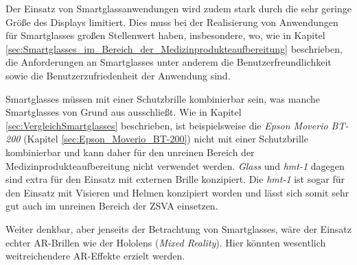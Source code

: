 Der Einsatz von Smartglassanwendungen wird zudem stark durch die sehr geringe Größe des Displays limitiert. Dies muss bei der Realisierung von Anwendungen für Smartglasses großen Stellenwert haben, insbesondere, wo, wie in Kapitel \ref{sec:Smartglasses_im_Bereich_der_Medizinprodukteaufbereitung} beschrieben, die Anforderungen an Smartglasses unter anderem die Benutzerfreundlichkeit sowie die Benutzerzufriedenheit der Anwendung sind.

Smartglasses müssen mit einer Schutzbrille kombinierbar sein, was manche Smartglasses von Grund aus ausschließt. Wie in Kapitel \ref{sec:VergleichSmartglasses} beschrieben, ist beispielsweise die \emph{Epson Moverio BT-200} (Kapitel \ref{sec:Epson_Moverio_BT-200}) nicht mit einer Schutzbrille kombinierbar und kann daher für den unreinen Bereich der Medizinprodukteaufbereitung nicht verwendet werden. \emph{Glass} und \emph{hmt-1} dagegen sind extra für den Einsatz mit externen Brille konzipiert. Die \emph{hmt-1} ist sogar für den Einsatz mit Visieren und Helmen konzipiert worden und lässt sich somit sehr gut auch im unreinen Bereich der ZSVA einsetzen.

Weiter denkbar, aber jenseits der Betrachtung von Smartglasses, wäre der Einsatz echter AR-Brillen wie der Hololens (\emph{Mixed Reality}). Hier könnten wesentlich weitreichendere AR-Effekte erzielt werden. 
